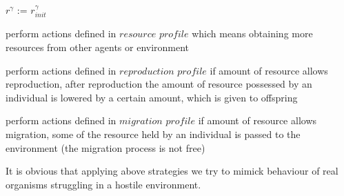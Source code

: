 \begin{algorithmic}

\STATE $r^{\gamma}$ := $r^{\gamma}_{init}$ 


\STATE {} 

  
\STATE perform actions defined in $resource$ $profile$ which means obtaining more resources from other agents or environment

\ELSE
                \STATE perform actions defined in $reproduction$ $profile$ if amount of resource allows reproduction, 
			after reproduction the amount of resource possessed by an individual is lowered by a certain amount, which is given to offspring
        \ENDIF

\ELSE 
                \STATE perform actions defined in $migration$ $profile$ if amount of resource allows migration, some of the resource held by an individual is
			passed to the environment (the migration process is not free)
        \ENDIF

\ENDIF

\ENDWHILE

\end{algorithmic}

It is obvious that applying above strategies we try to mimick behaviour of real organisms struggling in a hostile environment.

 
